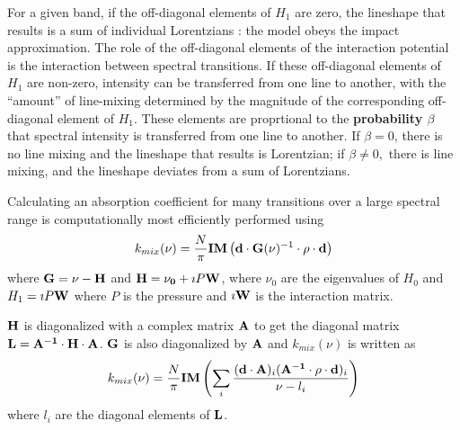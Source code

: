 \documentclass[11pt]{article}
\begin{document}
For a given band, if the off-diagonal elements of $H_{1}$ are zero, the 
lineshape that results is a sum of individual Lorentzians : the model obeys 
the impact approximation.  The role of the off-diagonal elements of the 
interaction potential is the interaction between spectral 
transitions. If these off-diagonal elements of  $H_{1}$ are non-zero, 
intensity can be transferred from one line to another, 
with the ``amount'' of line-mixing determined by the magnitude of the 
corresponding off-diagonal element of $H_{1}$.  These elements are
proprtional to the {\bf probability $\beta$} that spectral intensity is 
transferred from one line to another. If $\beta = 0$, there is no line 
mixing and the lineshape that results is Lorentzian; if $\beta \ne 0,$ 
there is line mixing, and the lineshape deviates from a sum of Lorentzians.

Calculating an absorption coefficient for many transitions over a
large spectral range is computationally most efficiently performed using 
\[
k_{mix}(\nu)=\frac{N}{\pi} {\bf IM} \left({\bf d}\cdot{\bf G}({
\bf
  \nu})^{-1} \cdot{\bf \rho}\cdot{\bf d}\right)
\]
where ${\bf G}={\bf \nu}-{\bf H}$ and 
${\bf H}={\bf \nu_{0}}+\imath P{\bf W}$, where $\nu_{0}$ are the 
eigenvalues of $H_{0}$ and $H_{1} = \imath P{\bf W}$ where $P$ is the 
pressure and $\imath {\bf W}$ is the interaction matrix. 
 
${\bf H}$ is diagonalized with a complex matrix ${\bf A}$ to get the 
diagonal matrix ${\bf L}={\bf A^{-1}}\cdot{\bf H}\cdot{\bf A}$.
${\bf G}$ is also diagonalized by ${\bf A}$ and $k_{mix}(\nu)$ is written
as
\[
k_{mix}(\nu)=\frac{N}{\pi} {\bf IM} \left(\sum_{i}\frac{({\bf d
\cdot
    A})_{i} ({\bf A^{-1}\cdot\rho\cdot d})_{i}}{\nu - l_{i}}\right)
\]
where $l_{i}$ are the diagonal elements of ${\bf L}$.  
\end{document}
